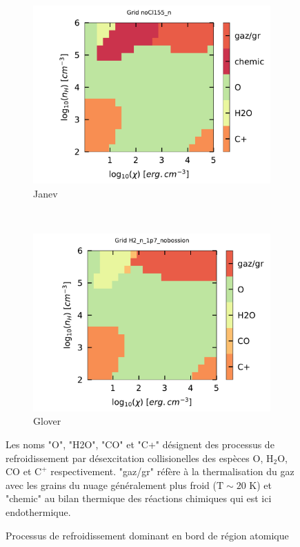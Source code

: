 \begin{figure}[!h]
    \begin{subfigure}[t]{0.49\textwidth} %
        \centering \includegraphics[trim = {0 0 0 1cm },clip,width=1\textwidth]{figure/H2/grid_janev/mapLmax.pdf}
        \caption{Janev}
    \end{subfigure}
    ~ 
    \begin{subfigure}[t]{0.49\textwidth}
        \centering \includegraphics[trim = {0 0 0 1cm },clip,width=1\textwidth]{figure/H2/grid_glover/mapLmax.pdf}
        \caption{Glover}
    \end{subfigure}
    \caption{Processus de refroidissement dominant en bord de région atomique}
    \begin{minipage}{\textwidth}
    Les noms "O", "H2O", "CO" et "C+" désignent des processus de refroidissement par désexcitation collisionelles des espèces $\mathrm{O}$, $\mathrm{H}_2\mathrm{O}$, $\mathrm{CO}$ et $\mathrm{C}^+$ respectivement. "gaz/gr" réfère à la thermalisation du gaz avec les grains du nuage généralement plus froid ($\mathrm{T}\sim20$ K) et "chemic" au bilan thermique des réactions chimiques qui est ici endothermique.
    \end{minipage}
    \label{fig:H2:JanevGlover:Lmax}
\end{figure}


